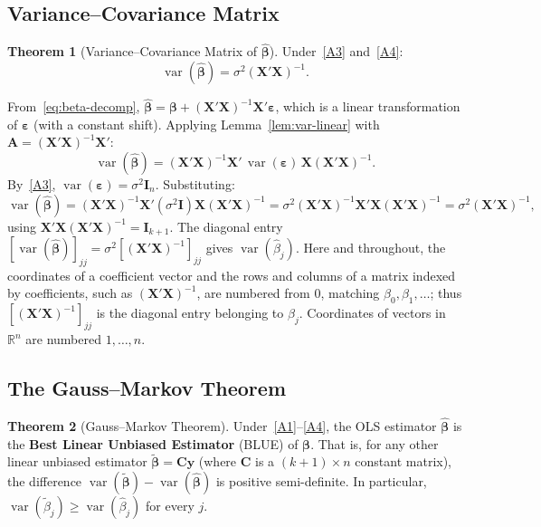 \documentclass[12pt,a4paper]{article}
\makeatletter
\theoremstyle{definition}
\newtheorem{theorem}{Theorem}[section]
\renewenvironment{proof}[1][\proofname]{\par
  \pushQED{\qed}%
  \normalfont \topsep6\p@\@plus6\p@\relax
  \trivlist
  \item[\hskip\labelsep\bfseries #1\@addpunct{.}]\ignorespaces
}{%
  \popQED\endtrivlist\@endpefalse
}
\DeclareMathOperator\var{var}
\newcommand{\bX}{\mathbf{X}}
\newcommand{\by}{\mathbf{y}}
\def\bb{\boldsymbol{\beta}}
\newcommand{\be}{\boldsymbol{\varepsilon}}
\newcommand{\bI}{\mathbf{I}}
\newcommand{\bA}{\mathbf{A}}
\newcommand{\bC}{\mathbf{C}}
\newcommand{\Real}{\mathbb{R}}
\makeatother
\begin{document}
\subsection{Variance--Covariance Matrix}

\begin{theorem}[Variance--Covariance Matrix of $\hat{\bb}$]\label{thm:var-beta}
Under~\ref{A3} and~\ref{A4}:
\begin{equation}
\boxed{\var(\hat{\bb}) = \sigma^2 (\bX'\bX)^{-1}.}
\end{equation}
\end{theorem}

\begin{proof}
From~\eqref{eq:beta-decomp}, $\hat{\bb} = \bb + (\bX'\bX)^{-1}\bX'\be$, which is a linear transformation of $\be$ (with a constant shift). Applying Lemma~\ref{lem:var-linear} with $\bA = (\bX'\bX)^{-1}\bX'$:
\[
\var(\hat{\bb}) = (\bX'\bX)^{-1}\bX'\,\var(\be)\,\bX(\bX'\bX)^{-1}.
\]
By~\ref{A3}, $\var(\be) = \sigma^2\bI_n$. Substituting:
\[
\var(\hat{\bb}) = (\bX'\bX)^{-1}\bX'(\sigma^2\bI)\bX(\bX'\bX)^{-1} = \sigma^2(\bX'\bX)^{-1}\bX'\bX(\bX'\bX)^{-1} = \sigma^2(\bX'\bX)^{-1},
\]
using $\bX'\bX(\bX'\bX)^{-1} = \bI_{k+1}$. The diagonal entry $[\var(\hat{\bb})]_{jj} = \sigma^2[(\bX'\bX)^{-1}]_{jj}$ gives $\var(\hat{\beta}_j)$. Here and throughout, the coordinates of a coefficient vector and the rows and columns of a matrix indexed by coefficients, such as $(\bX'\bX)^{-1}$, are numbered from $0$, matching $\beta_0, \beta_1, \ldots$; thus $[(\bX'\bX)^{-1}]_{jj}$ is the diagonal entry belonging to $\beta_j$. Coordinates of vectors in $\Real^n$ are numbered $1, \ldots, n$.
\end{proof}

\subsection{The Gauss--Markov Theorem}

\begin{theorem}[Gauss--Markov Theorem]\label{thm:gm}
Under~\ref{A1}--\ref{A4}, the OLS estimator $\hat{\bb}$ is the \textbf{Best Linear Unbiased Estimator} (BLUE) of $\bb$. That is, for any other linear unbiased estimator $\tilde{\bb} = \bC\by$ (where $\bC$ is a $(k+1) \times n$ constant matrix), the difference $\var(\tilde{\bb}) - \var(\hat{\bb})$ is positive semi-definite. In particular, $\var(\tilde{\beta}_j) \geqslant \var(\hat{\beta}_j)$ for every $j$.
\end{theorem}
\end{document}
